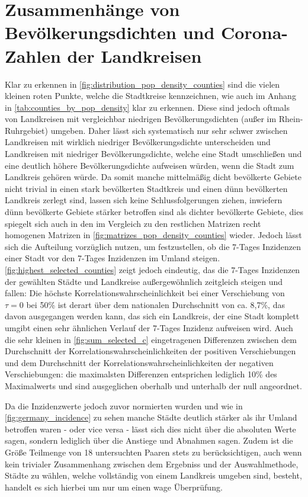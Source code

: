 \section{Zusammenhänge von Bevölkerungsdichten und Corona-Zahlen der Landkreisen}
Klar zu erkennen in \autoref{fig:distribution_pop_density_counties} sind die vielen kleinen roten Punkte, welche die Stadtkreise kennzeichnen, wie auch im Anhang in \autoref{tab:counties_by_pop_density} klar zu erkennen.
Diese sind jedoch oftmals von Landkreisen mit vergleichbar niedrigen Bevölkerungsdichten (außer im Rhein-Ruhrgebiet) umgeben. Daher lässt sich systematisch nur sehr schwer zwischen Landkreisen mit wirklich niedriger Bevölkerungsdichte unterscheiden und Landkreisen mit niedriger Bevölkerungsdichte, welche eine Stadt umschließen und eine deutlich höhere Bevölkerungsdichte aufweisen würden, wenn die Stadt zum Landkreis gehören würde. Da somit manche mittelmäßig dicht bevölkerte Gebiete nicht trivial in einen stark bevölkerten Stadtkreis und einen dünn bevölkerten Landkreis zerlegt sind, lassen sich keine Schlussfolgerungen ziehen, inwiefern dünn bevölkerte Gebiete stärker betroffen sind als dichter bevölkerte Gebiete, dies spiegelt sich auch in den im Vergleich zu den restlichen Matrizen recht homogenen Matrizen in \autoref{fig:matrizes_pop_density_counties} wieder.
Jedoch lässt sich die Aufteilung vorzüglich nutzen, um festzustellen, ob die 7-Tages Inzidenzen einer Stadt vor den 7-Tages Inzidenzen im Umland steigen.
\autoref{fig:highest_selected_counties} zeigt jedoch eindeutig, das die 7-Tages Inzidenzen der gewählten Städte und Landkreise außergewöhnlich zeitgleich steigen und fallen: Die höchste Korrelationswahrscheinlichkeit bei einer Verschiebung von $\tau=0$ bei 50\% ist derart über dem nationalen Durchschnitt von ca. 8,7\%, das davon ausgegangen werden kann, das sich ein Landkreis, der eine Stadt komplett umgibt einen sehr ähnlichen Verlauf der 7-Tages Inzidenz aufweisen wird.
Auch die sehr kleinen in \autoref{fig:sum_selected_c} eingetragenen Differenzen zwischen dem Durchschnitt der Korrelationswahrscheinlichkeiten der positiven Verschiebungen und dem Durchschnitt der Korrelationswahrscheinlichkeiten der negativen Verschiebungen: die maximalsten Differenzen entsprichen lediglich 10\% des Maximalwerts und sind ausgeglichen oberhalb und unterhalb der null angeordnet.

Da die Inzidenzwerte jedoch zuvor normierten wurden und wie in \autoref{fig:germany_incidence} zu sehen manche Städte deutlich stärker als ihr Umland betroffen waren - oder vice versa - lässt sich dies nicht über die absoluten Werte sagen, sondern lediglich über die Anstiege und Abnahmen sagen.
Zudem ist die Größe Teilmenge von 18 untersuchten Paaren stets zu berücksichtigen, auch wenn kein trivialer Zusammenhang zwischen dem Ergebniss und der Auswahlmethode, Städte zu wählen, welche vollständig von einem Landkreis umgeben sind, besteht, handelt es sich hierbei um nur um einen wage Überprüfung.

